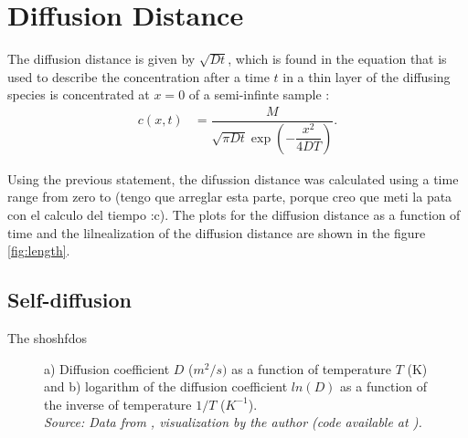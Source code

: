 \clearpage
\section{Diffusion Distance}

The diffusion distance is given by $\sqrt{Dt}$, which is found in the equation that is used to describe the concentration after a time $t$ in a thin layer of the diffusing species is concentrated at $x=0$ of a semi-infinte sample \cite{diff}:
\begin{align}
  \label{eq:3}
  c(x,t)&=\dfrac{M}{\sqrt{\pi D t} \exp\left(-\dfrac{x^2}{4DT}\right)}.
\end{align}

Using the previous statement, the difussion distance was calculated using a time range from zero to (tengo que arreglar esta parte, porque creo que meti la pata con el calculo del tiempo :c). The plots for the diffusion distance as a function of time and the lilnealization of the diffusion distance are shown in the figure \ref{fig:length}.

\subsection{Self-diffusion}

The shoshfdos

\begin{figure}[h]
 \centering
 \captionsetup{justification=centering}
 \caption{a) Diffusion coefficient $D$ ($m^2/s)$ as a function of temperature $T$ (K) and b) logarithm of the diffusion coefficient $ln(D)$ as a function of the inverse of temperature $1/T$ ($K^{-1}$). \\
 \textit{Source: Data from \citep{kakusan}, visualization by the author (code available at \citep{mygit}).}}
 \label{fig:diffusion}
\end{figure}


